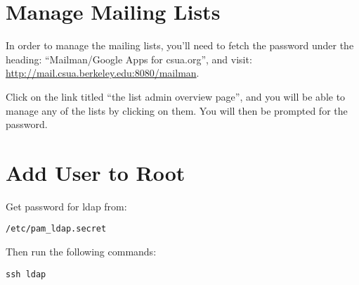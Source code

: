 \documentclass[letterpaper]{book}
\begin{document}
\section{Manage Mailing Lists}
In order to manage the mailing lists, you'll need to fetch the password under
the heading: ``Mailman/Google Apps for csua.org'', and visit: 
\url{http://mail.csua.berkeley.edu:8080/mailman}.

Click on the link titled ``the list admin overview page'', and you will be able
to manage any of the lists by clicking on them. You will then be prompted for
the password.

\section{Add User to Root}
Get password for ldap from:
\begin{verbatim}
/etc/pam_ldap.secret
\end{verbatim}
Then run the following commands:
\begin{verbatim}
ssh ldap
\end{verbatim}
\end{document}

